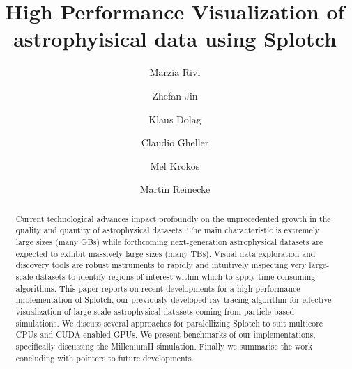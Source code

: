 

\title{High Performance Visualization of astrophyisical data using Splotch}


\author{Marzia Rivi}
\address{CINECA, Via Magnanelli 6/3, Casalecchio di Reno, Italy}

\author{Zhefan Jin}
\address{School of Creative Technologies, University of Portsmouth, Portsmouth, United Kindom}

\author{Klaus Dolag}
\address{Max-Planck-Institut f\"ur Astrophysik, Karl-Schwarzschild Strasse 1, Garching bei M\"unchen, Germany}

\author{Claudio Gheller }
\address{CINECA, Via Magnanelli 6/3, Casalecchio di Reno, Italy}

\author{Mel Krokos }
\address{...}

\author{Martin Reinecke}
\address{Max-Planck-Institut f\"ur Astrophysik, Karl-Schwarzschild Strasse 1, Garching bei M\"unchen, Germany}

\begin{abstract}

Current technological advances impact profoundly on the unprecedented
growth in the quality and quantity of astrophysical datasets. The main
characteristic is extremely large sizes (many GBs) while forthcoming
next-generation astrophysical datasets are expected to exhibit
massively large sizes (many TBs). Visual data exploration and
discovery tools are robust instruments to rapidly and intuitively
inspecting very large-scale datasets to identify regions of interest
within which to apply time-consuming algorithms.  This paper reports
on recent developments for a high performance implementation of
Splotch, our previously developed ray-tracing algorithm for effective
visualization of large-scale astrophysical datasets coming from
particle-based simulations.  We discuss several approaches for
paralellizing Splotch to suit multicore CPUs and CUDA-enabled GPUs. We
present benchmarks of our implementations, specifically discussing the
MilleniumII simulation. Finally we summarise the work concluding with
pointers to future developments.

\end{abstract}

